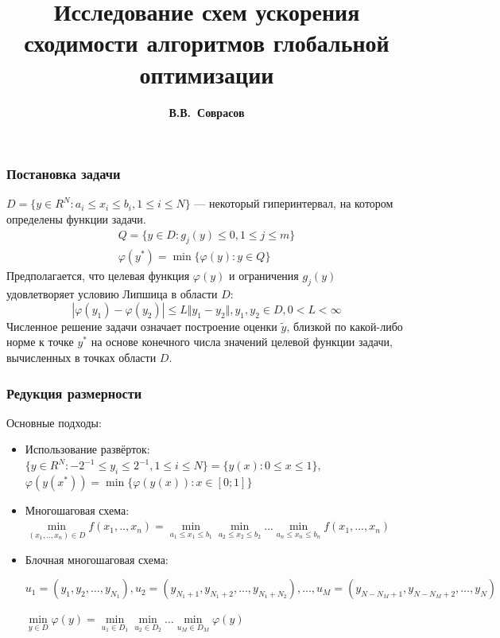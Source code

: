 \documentclass[aspectratio=1610]{beamer}
\title{Исследование схем ускорения сходимости алгоритмов глобальной оптимизации}
\author{\textbf{В.В.~Соврасов}}
\institute{ННГУ им. Н.И. Лобачевского}
\date{}
\begin{document}
\begin{frame}
\titlepage
\end{frame}

\begin{frame}
  \frametitle{Постановка задачи}
    \(D=\{y\in R^N:a_i\leqslant x_i\leqslant{b_i}, 1\leqslant{i}\leqslant{N}\}\) ---
    некоторый гиперинтервал, на котором определены функции задачи.
  \begin{displaymath}
    \begin{array}{c}
      Q=\{y\in D: g_j(y)\leqslant 0,  1\leqslant{j}\leqslant{m}\}  \\
      \varphi(y^*)=\min\{\varphi(y):y\in Q\}
    \end{array}
  \end{displaymath}
  Предполагается, что целевая функция \(\varphi(y)\) и ограничения \(g_j(y)\) удовлетворяет условию Липшица в области \(D\):
  \begin{displaymath}
  |\varphi(y_1)-\varphi(y_2)|\leqslant L\Vert y_1-y_2\Vert,y_1,y_2\in D,0<L<\infty
  \end{displaymath}
  Численное решение задачи означает построение оценки \(\widetilde{y}\), близкой по какой-либо
  норме к точке \(y^*\) на основе конечного числа значений целевой функции задачи,
  вычисленных в точках области \(D\).
\end{frame}

\begin{frame}
  \frametitle{Редукция размерности}
  Основные подходы:
  \begin{itemize}
    \item<1-> Использование развёрток:
    \(\lbrace y\in R^N:-2^{-1}\leqslant y_i\leqslant 2^{-1},1\leqslant i\leqslant N\rbrace=\{y(x):0\leqslant x\leqslant 1\}\),
    \(\varphi(y(x^*))=\min\{\varphi(y(x)):x\in [0;1]\}\)
    \item<2-> Многошаговая схема:
    \(\min\limits_{(x_1,..,x_n)\in D} f(x_1,..,x_n)=\min\limits_{a_1\leqslant x_1\leqslant b_1}\min\limits_{a_2\leqslant x_2\leqslant b_2}...\min\limits_{a_n\leqslant x_n\leqslant b_n} f(x_1,...,x_n)\)
    \item<3-> Блочная многошаговая схема:

    \(u_1=(y_1,y_2,\dots,y_{N_1}),u_2=(y_{N_1+1},y_{N_1+2},\dots,y_{N_1+N_2}),\dots,u_M=(y_{N-N_M+1},y_{N-N_M+2},\dots,y_N)\)

    \(\min\limits_{y\in D}\varphi(y)=\min\limits_{u_1\in D_1}\min\limits_{u_2\in D_2}\dots\min\limits_{u_M\in D_M}\varphi(y)\)
  \end{itemize}

\end{frame}
\end{document}
